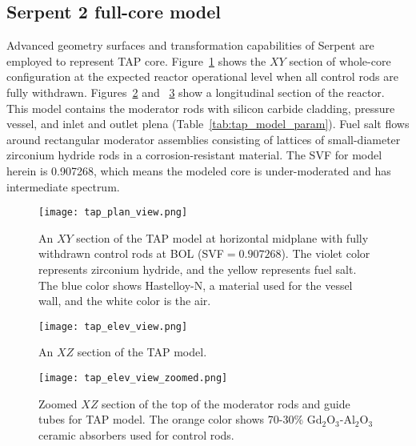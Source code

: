 \subsection{Serpent 2 full-core model} \label{sec:tap_model}
Advanced geometry surfaces and transformation capabilities of Serpent 
\cite{leppanen_serpent_2013} are employed to represent \gls{TAP} core. 
Figure~\ref{fig:tap-serpent-plan} shows the $XY$ section of whole-core
configuration at the expected reactor operational level when all
control rods are fully withdrawn. Figures~\ref{fig:tap-serpent-elev} and 
~\ref{fig:tap-serpent-elev-zoom} show a longitudinal section of the reactor. 
This model contains the moderator rods with silicon carbide cladding, pressure 
vessel, and inlet and outlet plena (Table~\ref{tab:tap_model_param}). Fuel 
salt flows around rectangular moderator assemblies consisting of lattices of 
small-diameter zirconium hydride rods in a corrosion-resistant material. The 
\gls{SVF} for model herein is 0.907268, which means the modeled core is 
under-moderated and has intermediate spectrum.
\begin{figure}[htp!] %
	\centering
	\texttt{[image: tap\_plan\_view.png]}
	\caption{An $XY$ section of the \gls{TAP} model at horizontal midplane 
		with fully withdrawn control rods at \gls{BOL} (\gls{SVF}$=0.907268$). 
		The violet color represents zirconium 
		hydride, and the yellow represents fuel salt. The blue color shows 
		Hastelloy-N, a material used for the vessel wall, and the white color 
		is the air.}
	\label{fig:tap-serpent-plan}
\end{figure}
\begin{figure}[htp!] %
	\centering
	\texttt{[image: tap\_elev\_view.png]}
	\caption{An $XZ$ section of the \gls{TAP} model.}
	\label{fig:tap-serpent-elev}
\end{figure}
\begin{figure}[htp!] %
	\centering
	\texttt{[image: tap\_elev\_view\_zoomed.png]}
	\caption{Zoomed $XZ$ section of the top of the moderator rods and guide 
	tubes for \gls{TAP} model. The orange color shows 70-30\%  
	Gd$_2$O$_3$-Al$_2$O$_3$ ceramic absorbers used for control rods.}
	\label{fig:tap-serpent-elev-zoom}
\end{figure}

